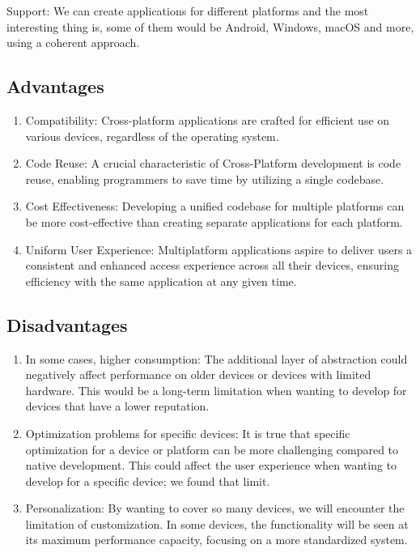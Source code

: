 \documentclass[12pt,a4paper, twosite]{article}
\begin{document}
Support: We can create applications for different platforms and the most interesting thing is, some of them would be Android, Windows, macOS and more, using a coherent approach.
	\subsection{Advantages}
	\label{sec:user-characteristics}
	\begin{enumerate}
		\item Compatibility: Cross-platform applications are crafted for efficient use on various devices, regardless of the operating system.
		
		\item Code Reuse: A crucial characteristic of Cross-Platform development is code reuse, enabling programmers to save time by utilizing a single codebase.
		
		\item Cost Effectiveness: Developing a unified codebase for multiple platforms can be more cost-effective than creating separate applications for each platform.
		
		\item Uniform User Experience: Multiplatform applications aspire to deliver users a consistent and enhanced access experience across all their devices, ensuring efficiency with the same application at any given time.
	\end{enumerate}
	
	\subsection{Disadvantages}
	\label{sec:constraints}
\begin{enumerate}
	\item In some cases, higher consumption: The additional layer of abstraction could negatively affect performance on older devices or devices with limited hardware. This would be a long-term limitation when wanting to develop for devices that have a lower reputation.
	
	\item Optimization problems for specific devices: It is true that specific optimization for a device or platform can be more challenging compared to native development. This could affect the user experience when wanting to develop for a specific device; we found that limit.
	
	\item Personalization: By wanting to cover so many devices, we will encounter the limitation of customization. In some devices, the functionality will be seen at its maximum performance capacity, focusing on a more standardized system.
\end{enumerate}
	
\end{document}
